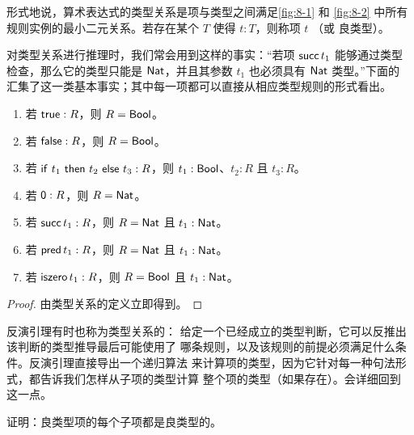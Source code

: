 \begin{definition}
\label{def:8.2.1}
形式地说，算术表达式的类型关系是项与类型之间满足\cref{fig:8-1} 和
\cref{fig:8-2} 中所有规则实例的最小二元关系。若存在某个 \(T\) 使得
\(t:T\)，则称项 \(t\) （或
良类型）。
\end{definition}

对类型关系进行推理时，我们常会用到这样的事实：“若项
\(\mathsf{succ}\,t_1\) 能够通过类型检查，那么它的类型只能是
\(\mathsf{Nat}\)，并且其参数 \(t_1\) 也必须具有
\(\mathsf{Nat}\) 类型。”下面的
汇集了这一类基本事实；其中每一项都可以直接从相应类型规则的形式看出。

\taplstatementliststart
\begin{lemma}[类型关系的反演]
\label{lem:8.2.2}
\taplstatementlistbreak
\begin{enumerate}
  \item 若 \(\mathsf{true}:R\)，则 \(R=\mathsf{Bool}\)。
  \item 若 \(\mathsf{false}:R\)，则 \(R=\mathsf{Bool}\)。
  \item 若 \(\mathsf{if}\ t_1\ \mathsf{then}\ t_2\ \mathsf{else}\ t_3:R\)，则
    \(t_1:\mathsf{Bool}\)、\(t_2:R\) 且 \(t_3:R\)。
  \item 若 \(\mathsf{0}:R\)，则 \(R=\mathsf{Nat}\)。
  \item 若 \(\mathsf{succ}\,t_1:R\)，则
    \(R=\mathsf{Nat}\) 且 \(t_1:\mathsf{Nat}\)。
  \item 若 \(\mathsf{pred}\,t_1:R\)，则
    \(R=\mathsf{Nat}\) 且 \(t_1:\mathsf{Nat}\)。
  \item 若 \(\mathsf{iszero}\,t_1:R\)，则
    \(R=\mathsf{Bool}\) 且 \(t_1:\mathsf{Nat}\)。
\end{enumerate}
\end{lemma}

\begin{proof}
由类型关系的定义立即得到。
\end{proof}

反演引理有时也称为类型关系的：
给定一个已经成立的类型判断，它可以反推出该判断的类型推导最后可能使用了
哪条规则，以及该规则的前提必须满足什么条件。反演引理直接导出一个递归算法
来计算项的类型，因为它针对每一种句法形式，都告诉我们怎样从子项的类型计算
整个项的类型（如果存在）。会详细回到
这一点。

\begin{exercise}[\(\star,\nrightarrow\)]
\label{ex:8.2.3}
证明：良类型项的每个子项都是良类型的。
\end{exercise}

